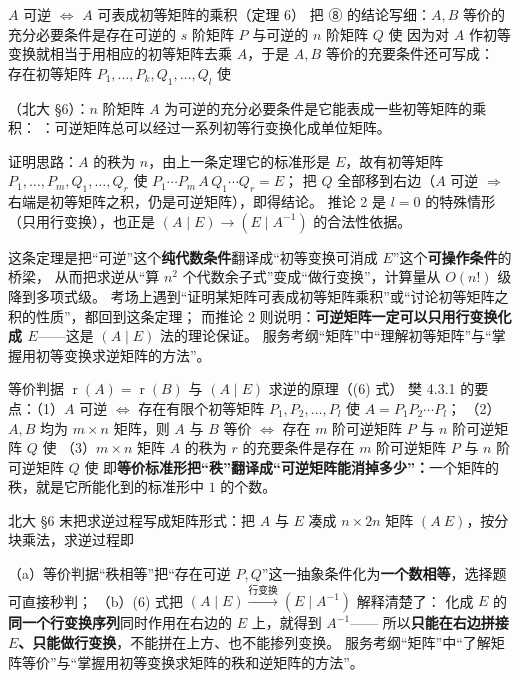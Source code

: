 \begin{fdeep}{$A$ 可逆 $\iff$ $A$ 可表成初等矩阵的乘积（定理 6）}
把 ⑧ 的结论写细：$A,B$ 等价的充分必要条件是存在可逆的 $s$ 阶矩阵 $P$ 与可逆的 $n$ 阶矩阵 $Q$ 使
因为对 $A$ 作初等变换就相当于用相应的初等矩阵去乘 $A$，于是 $A,B$ 等价的充要条件还可写成：
存在初等矩阵 $P_1,\dots,P_k,Q_1,\dots,Q_l$ 使

（北大 §6）：$n$ 阶矩阵 $A$ 为可逆的充分必要条件是它能表成一些初等矩阵的乘积：
：可逆矩阵总可以经过一系列初等行变换化成单位矩阵。

证明思路：$A$ 的秩为 $n$，由上一条定理它的标准形是 $E$，故有初等矩阵
$P_1,\dots,P_m,Q_1,\dots,Q_r$ 使 $P_1\cdots P_m\,A\,Q_1\cdots Q_r=E$；
把 $Q$ 全部移到右边（$A$ 可逆 $\Rightarrow$ 右端是初等矩阵之积，仍是可逆矩阵），即得结论。
推论 2 是 $l=0$ 的特殊情形（只用行变换），也正是 $(A\mid E)\to(E\mid A^{-1})$ 的合法性依据。

这条定理是把“可逆”这个\textbf{纯代数条件}翻译成“初等变换可消成 $E$”这个\textbf{可操作条件}的桥梁，
从而把求逆从“算 $n^2$ 个代数余子式”变成“做行变换”，计算量从 $O(n!)$ 级降到多项式级。
考场上遇到“证明某矩阵可表成初等矩阵乘积”或“讨论初等矩阵之积的性质”，都回到这条定理；
而推论 2 则说明：\textbf{可逆矩阵一定可以只用行变换化成 $E$}——这是 $(A\mid E)$ 法的理论保证。
\fbref{}服务考纲“矩阵”中“理解初等矩阵”与“掌握用初等变换求逆矩阵的方法”。
\end{fdeep}

\begin{fdeep}{等价判据 $\operatorname{r}(A)=\operatorname{r}(B)$ 与 $(A\mid E)$ 求逆的原理（(6) 式）}
樊 4.3.1 的要点：（1）$A$ 可逆 $\iff$ 存在有限个初等矩阵 $P_1,P_2,\dots,P_l$ 使 $A=P_1P_2\cdots P_l$；
（2）$A,B$ 均为 $m\times n$ 矩阵，则 $A$ 与 $B$ 等价 $\iff$ 存在 $m$ 阶可逆矩阵 $P$ 与 $n$ 阶可逆矩阵 $Q$ 使
（3）$m\times n$ 矩阵 $A$ 的秩为 $r$ 的充要条件是存在 $m$ 阶可逆矩阵 $P$ 与 $n$ 阶可逆矩阵 $Q$ 使
即\textbf{等价标准形把“秩”翻译成“可逆矩阵能消掉多少”：}一个矩阵的秩，就是它所能化到的标准形中 $1$ 的个数。

北大 §6 末把求逆过程写成矩阵形式：把 $A$ 与 $E$ 凑成 $n\times2n$ 矩阵 $(A\ E)$，按分块乘法，求逆过程即

（a）等价判据“秩相等”把“存在可逆 $P,Q$”这一抽象条件化为\textbf{一个数相等}，选择题可直接秒判；
（b）(6) 式把 $(A\mid E)\xrightarrow{\text{行变换}}(E\mid A^{-1})$ 解释清楚了：
化成 $E$ 的\textbf{同一个行变换序列}同时作用在右边的 $E$ 上，就得到 $A^{-1}$——
所以\textbf{只能在右边拼接 $E$、只能做行变换}，不能拼在上方、也不能掺列变换。
\fbref{}服务考纲“矩阵”中“了解矩阵等价”与“掌握用初等变换求矩阵的秩和逆矩阵的方法”。
\end{fdeep}

